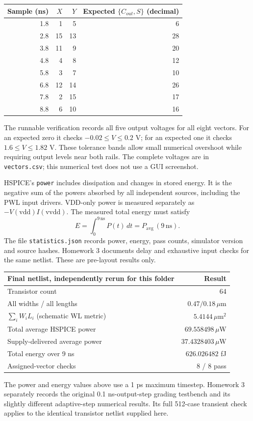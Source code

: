 \documentclass[10pt,a4paper]{article}
\begin{document}
\begin{center}
\begin{tabular}{rrrr}
\toprule
Sample (ns)&$X$&$Y$&Expected $\{C_{out},S\}$ (decimal)\\
\midrule
1.8&1&5&6\\2.8&15&13&28\\3.8&11&9&20\\4.8&4&8&12\\
5.8&3&7&10\\6.8&12&14&26\\7.8&2&15&17\\8.8&6&10&16\\
\bottomrule
\end{tabular}
\end{center}

The runnable verification records all five output voltages for all eight vectors.
For an expected zero it checks $-0.02\le V\le0.2$ V; for an expected one it checks
$1.6\le V\le1.82$ V. These tolerance bands allow small numerical overshoot while
requiring output levels near both rails. The complete voltages are in
\texttt{vectors.csv}; this numerical test does not use a GUI screenshot.

HSPICE's \texttt{power} includes dissipation and changes in stored energy. It is
the negative sum of the powers absorbed by all independent sources, including
the PWL input drivers. VDD-only power is measured separately as
$-V(\mathrm{vdd})I(\mathrm{vvdd})$. The measured total energy must satisfy
\[
 E=\int_0^{9\,\mathrm{ns}}P(t)\,dt
   =P_{\mathrm{avg}}\,(9\,\mathrm{ns}).
\]
The file \texttt{statistics.json} records power, energy, pass counts,
simulator version and source hashes. Homework 3 documents delay and exhaustive
input checks for the same netlist. These are pre-layout results only.

\begin{center}
\begin{tabular}{lr}
\toprule
Final netlist, independently rerun for this folder & Result\\
\midrule
Transistor count & 64\\
All widths / all lengths & $0.47/0.18\,\mu$m\\
$\sum_i W_iL_i$ (schematic WL metric) & $5.4144\,\mu\mathrm{m}^2$\\
Total average HSPICE power & $69.558498\,\mu$W\\
Supply-delivered average power & $37.4328403\,\mu$W\\
Total energy over 9 ns & $626.026482$ fJ\\
Assigned-vector checks & 8 / 8 pass\\
\bottomrule
\end{tabular}
\end{center}
The power and energy values above use a 1 ps maximum timestep. Homework 3
separately records the original 0.1 ns-output-step grading testbench and its
slightly different adaptive-step numerical results. Its full 512-case
transient check applies to the identical transistor netlist supplied here.
\end{document}
